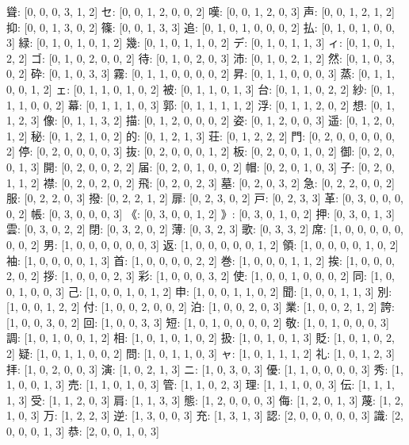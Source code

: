 \documentclass[a4paper,10pt,ngerman]{scrartcl}
\begin{document}
聳: [0, 0, 0, 3, 1, 2]
セ: [0, 0, 1, 2, 0, 0, 2]
嘆: [0, 0, 1, 2, 0, 3]
声: [0, 0, 1, 2, 1, 2]
抑: [0, 0, 1, 3, 0, 2]
篠: [0, 0, 1, 3, 3]
追: [0, 1, 0, 1, 0, 0, 0, 2]
払: [0, 1, 0, 1, 0, 0, 3]
緑: [0, 1, 0, 1, 0, 1, 2]
幾: [0, 1, 0, 1, 1, 0, 2]
デ: [0, 1, 0, 1, 1, 3]
ィ: [0, 1, 0, 1, 2, 2]
ゴ: [0, 1, 0, 2, 0, 0, 2]
待: [0, 1, 0, 2, 0, 3]
沛: [0, 1, 0, 2, 1, 2]
然: [0, 1, 0, 3, 0, 2]
砕: [0, 1, 0, 3, 3]
霧: [0, 1, 1, 0, 0, 0, 0, 2]
昇: [0, 1, 1, 0, 0, 0, 3]
蒸: [0, 1, 1, 0, 0, 1, 2]
ェ: [0, 1, 1, 0, 1, 0, 2]
被: [0, 1, 1, 0, 1, 3]
台: [0, 1, 1, 0, 2, 2]
紗: [0, 1, 1, 1, 0, 0, 2]
幕: [0, 1, 1, 1, 0, 3]
郭: [0, 1, 1, 1, 1, 2]
浮: [0, 1, 1, 2, 0, 2]
想: [0, 1, 1, 2, 3]
像: [0, 1, 1, 3, 2]
描: [0, 1, 2, 0, 0, 0, 2]
姿: [0, 1, 2, 0, 0, 3]
遥: [0, 1, 2, 0, 1, 2]
秘: [0, 1, 2, 1, 0, 2]
的: [0, 1, 2, 1, 3]
荘: [0, 1, 2, 2, 2]
門: [0, 2, 0, 0, 0, 0, 0, 2]
停: [0, 2, 0, 0, 0, 0, 3]
抜: [0, 2, 0, 0, 0, 1, 2]
板: [0, 2, 0, 0, 1, 0, 2]
御: [0, 2, 0, 0, 1, 3]
開: [0, 2, 0, 0, 2, 2]
届: [0, 2, 0, 1, 0, 0, 2]
帽: [0, 2, 0, 1, 0, 3]
子: [0, 2, 0, 1, 1, 2]
襟: [0, 2, 0, 2, 0, 2]
飛: [0, 2, 0, 2, 3]
墓: [0, 2, 0, 3, 2]
急: [0, 2, 2, 0, 0, 2]
服: [0, 2, 2, 0, 3]
撥: [0, 2, 2, 1, 2]
扉: [0, 2, 3, 0, 2]
戸: [0, 2, 3, 3]
革: [0, 3, 0, 0, 0, 0, 2]
帳: [0, 3, 0, 0, 0, 3]
《: [0, 3, 0, 0, 1, 2]
》: [0, 3, 0, 1, 0, 2]
押: [0, 3, 0, 1, 3]
雲: [0, 3, 0, 2, 2]
閉: [0, 3, 2, 0, 2]
薄: [0, 3, 2, 3]
歌: [0, 3, 3, 2]
席: [1, 0, 0, 0, 0, 0, 0, 0, 2]
男: [1, 0, 0, 0, 0, 0, 0, 3]
返: [1, 0, 0, 0, 0, 0, 1, 2]
領: [1, 0, 0, 0, 0, 1, 0, 2]
袖: [1, 0, 0, 0, 0, 1, 3]
首: [1, 0, 0, 0, 0, 2, 2]
巻: [1, 0, 0, 0, 1, 1, 2]
挨: [1, 0, 0, 0, 2, 0, 2]
拶: [1, 0, 0, 0, 2, 3]
彩: [1, 0, 0, 0, 3, 2]
使: [1, 0, 0, 1, 0, 0, 0, 2]
同: [1, 0, 0, 1, 0, 0, 3]
己: [1, 0, 0, 1, 0, 1, 2]
申: [1, 0, 0, 1, 1, 0, 2]
聞: [1, 0, 0, 1, 1, 3]
別: [1, 0, 0, 1, 2, 2]
付: [1, 0, 0, 2, 0, 0, 2]
泊: [1, 0, 0, 2, 0, 3]
業: [1, 0, 0, 2, 1, 2]
誇: [1, 0, 0, 3, 0, 2]
回: [1, 0, 0, 3, 3]
短: [1, 0, 1, 0, 0, 0, 0, 2]
敬: [1, 0, 1, 0, 0, 0, 3]
調: [1, 0, 1, 0, 0, 1, 2]
相: [1, 0, 1, 0, 1, 0, 2]
扱: [1, 0, 1, 0, 1, 3]
貶: [1, 0, 1, 0, 2, 2]
疑: [1, 0, 1, 1, 0, 0, 2]
問: [1, 0, 1, 1, 0, 3]
ャ: [1, 0, 1, 1, 1, 2]
礼: [1, 0, 1, 2, 3]
拝: [1, 0, 2, 0, 0, 3]
演: [1, 0, 2, 1, 3]
ニ: [1, 0, 3, 0, 3]
優: [1, 1, 0, 0, 0, 0, 3]
秀: [1, 1, 0, 0, 1, 3]
売: [1, 1, 0, 1, 0, 3]
管: [1, 1, 0, 2, 3]
理: [1, 1, 1, 0, 0, 3]
伝: [1, 1, 1, 1, 3]
受: [1, 1, 2, 0, 3]
肩: [1, 1, 3, 3]
態: [1, 2, 0, 0, 0, 3]
侮: [1, 2, 0, 1, 3]
蔑: [1, 2, 1, 0, 3]
万: [1, 2, 2, 3]
逆: [1, 3, 0, 0, 3]
充: [1, 3, 1, 3]
認: [2, 0, 0, 0, 0, 0, 3]
識: [2, 0, 0, 0, 1, 3]
恭: [2, 0, 0, 1, 0, 3]
\end{document}
